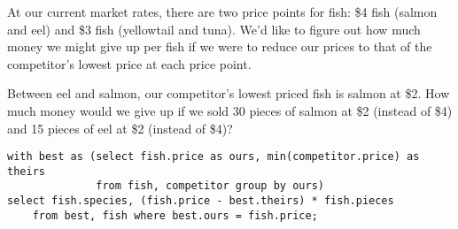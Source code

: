 \begin{blocksection}
\question At our current market rates, there are two price points for fish: \$4 fish (salmon and eel) and \$3 fish (yellowtail and tuna). We'd like to figure out how much money we might give up per fish if we were to reduce our prices to that of the competitor's lowest price at each price point.

Between eel and salmon, our competitor's lowest priced fish is salmon at \$2. How much money would we give up if we sold 30 pieces of salmon at \$2 (instead of \$4) and 15 pieces of eel at \$2 (instead of \$4)?

\begin{solution}[1.5in]
\begin{lstlisting}
with best as (select fish.price as ours, min(competitor.price) as theirs
              from fish, competitor group by ours)
select fish.species, (fish.price - best.theirs) * fish.pieces
    from best, fish where best.ours = fish.price;
\end{lstlisting}
\end{solution}
\end{blocksection}

